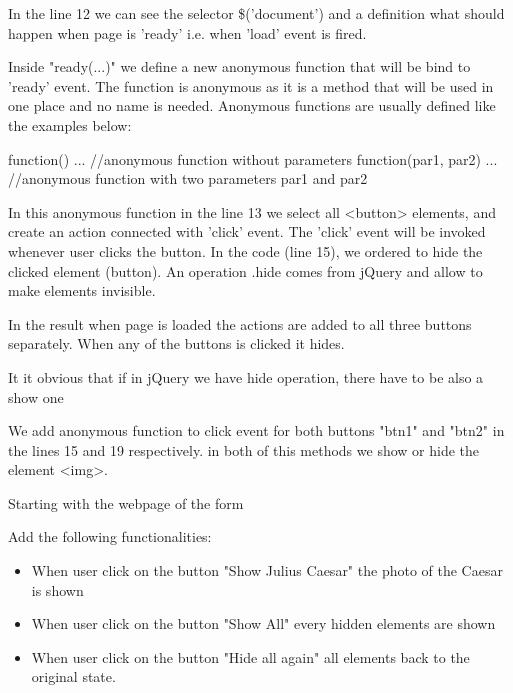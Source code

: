 \begin{explain}
In the line 12 we can see the selector \$('document') and a definition what should happen when page is 'ready' i.e. when 'load' event is fired.

Inside "ready(...)" we define a new anonymous function that will be bind to 'ready' event. The function is anonymous as it is a method that will be used in one place and no name is needed. Anonymous functions are usually defined like the examples below:
\begin{js}
 function() { ...} //anonymous function without parameters
 function(par1, par2) { ...} //anonymous function with two parameters par1 and par2
\end{js}

In this anonymous function in the line 13 we select all <button> elements, and create an action connected with 'click' event. The 'click' event will be invoked whenever user clicks the button. In the code (line 15), we ordered to hide the clicked element (button). An operation .hide comes from jQuery and allow to make elements invisible.


In the result when page is loaded the actions are added to all three buttons separately. When any of the buttons is clicked it hides.


\end{explain}

It it obvious that if in jQuery we have hide operation, there have to be also a show one


\begin{explain}
We add anonymous function to click event for both buttons "btn1" and "btn2" in the lines 15 and 19 respectively. in both of this methods we show or hide the element <img>.
\end{explain}

\begin{extercises}
Starting with the webpage of the form


Add the following functionalities:
\begin{itemize}
\item When user click on the button "Show Julius Caesar" the photo of the Caesar is shown
\item When user click on the button "Show All" every hidden elements are shown
\item When user click on the button "Hide all again" all elements back to the original state.
\end{itemize}
\end{extercises}

